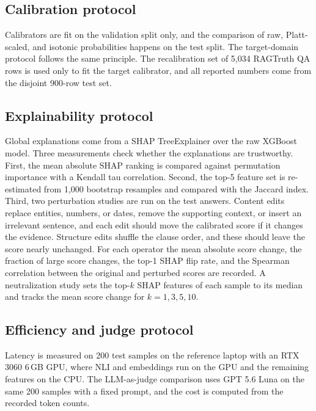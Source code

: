\subsection{Calibration protocol}

Calibrators are fit on the validation split only, and the comparison of raw, Platt-scaled, and isotonic probabilities happens on the test split. The target-domain protocol follows the same principle. The recalibration set of 5{,}034 RAGTruth QA rows is used only to fit the target calibrator, and all reported numbers come from the disjoint 900-row test set.

\subsection{Explainability protocol}

Global explanations come from a SHAP TreeExplainer \cite{shap} over the raw XGBoost model. Three measurements check whether the explanations are trustworthy. First, the mean absolute SHAP ranking is compared against permutation importance with a Kendall tau correlation. Second, the top-5 feature set is re-estimated from 1{,}000 bootstrap resamples and compared with the Jaccard index. Third, two perturbation studies are run on the test answers. Content edits replace entities, numbers, or dates, remove the supporting context, or insert an irrelevant sentence, and each edit should move the calibrated score if it changes the evidence. Structure edits shuffle the clause order, and these should leave the score nearly unchanged. For each operator the mean absolute score change, the fraction of large score changes, the top-1 SHAP flip rate, and the Spearman correlation between the original and perturbed scores are recorded. A neutralization study sets the top-$k$ SHAP features of each sample to its median and tracks the mean score change for $k = 1, 3, 5, 10$.

\subsection{Efficiency and judge protocol}

Latency is measured on 200 test samples on the reference laptop with an RTX 3060 6\,GB GPU, where NLI and embeddings run on the GPU and the remaining features on the CPU. The LLM-as-judge comparison uses GPT 5.6 Luna on the same 200 samples with a fixed prompt, and the cost is computed from the recorded token counts.
